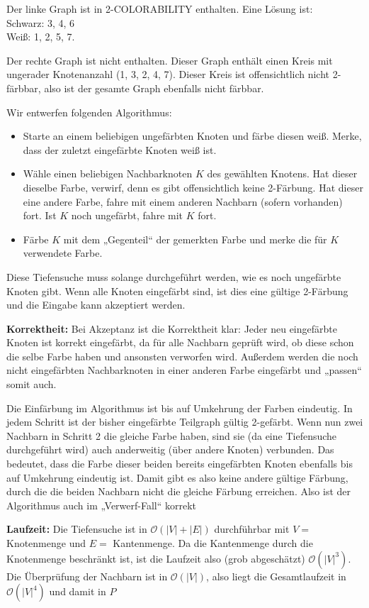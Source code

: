 Der linke Graph ist in 2-COLORABILITY enthalten. Eine Lösung ist: \\
Schwarz: 3, 4, 6 \\
Weiß: 1, 2, 5, 7.

Der rechte Graph ist nicht enthalten. Dieser Graph enthält einen Kreis mit
ungerader Knotenanzahl (1, 3, 2, 4, 7). Dieser Kreis ist offensichtlich nicht
2-färbbar, also ist der gesamte Graph ebenfalls nicht färbbar.

Wir entwerfen folgenden Algorithmus: 

\begin{itemize}
\item Starte an einem beliebigen ungefärbten Knoten und färbe diesen weiß.
      Merke, dass der zuletzt eingefärbte Knoten weiß ist.
\item Wähle einen beliebigen Nachbarknoten $K$ des gewählten Knotens. Hat dieser
      dieselbe Farbe, verwirf, denn es gibt offensichtlich keine 2-Färbung.
	  Hat dieser eine andere Farbe, fahre mit einem anderen Nachbarn (sofern
	  vorhanden) fort. Ist $K$ noch ungefärbt, fahre mit $K$ fort.
\item Färbe $K$ mit dem „Gegenteil“ der gemerkten Farbe und merke die für $K$
      verwendete Farbe.
\end{itemize}

Diese Tiefensuche muss solange durchgeführt werden, wie es noch ungefärbte
Knoten gibt. Wenn alle Knoten eingefärbt sind, ist dies eine gültige 2-Färbung
und die Eingabe kann akzeptiert werden.

\textbf{Korrektheit:} Bei Akzeptanz ist die Korrektheit klar: Jeder neu
eingefärbte Knoten ist korrekt eingefärbt, da für alle Nachbarn geprüft wird, ob
diese schon die selbe Farbe haben und ansonsten verworfen wird. Außerdem werden
die noch nicht eingefärbten Nachbarknoten in einer anderen Farbe eingefärbt und
„passen“ somit auch.

Die Einfärbung im Algorithmus ist bis auf Umkehrung der Farben eindeutig. In
jedem Schritt ist der bisher eingefärbte Teilgraph gültig 2-gefärbt. Wenn nun
zwei Nachbarn in Schritt 2 die gleiche Farbe haben, sind sie (da eine
Tiefensuche durchgeführt wird) auch anderweitig (über andere Knoten) verbunden.
Das bedeutet, dass die Farbe dieser beiden bereits eingefärbten Knoten ebenfalls
bis auf Umkehrung eindeutig ist. Damit gibt es also keine andere gültige
Färbung, durch die die beiden Nachbarn nicht die gleiche Färbung erreichen. Also
ist der Algorithmus auch im „Verwerf-Fall“ korrekt

\textbf{Laufzeit:} Die Tiefensuche ist in $\mathcal{O}(|V| + |E|)$ durchführbar
mit $V =$ Knotenmenge und $E =$ Kantenmenge. Da die Kantenmenge durch die
Knotenmenge beschränkt ist, ist die Laufzeit also (grob abgeschätzt)
$\mathcal{O}(|V|^3)$. Die Überprüfung der Nachbarn ist in $\mathcal{O}(|V|)$,
also liegt die Gesamtlaufzeit in $\mathcal{O}(|V|^4)$ und damit in $P$
